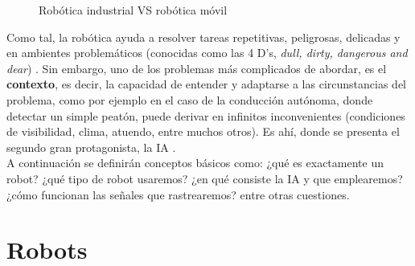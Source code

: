 \begin{figure} [h]
	\centering
	\quad
	\quad
	\caption{Robótica industrial VS robótica móvil}
	\label{fig:industrial_vs_mobile}
\end{figure}

Como tal, la robótica ayuda a resolver tareas repetitivas, peligrosas, delicadas y en ambientes problemáticos (conocidas como las 4 D's, \emph{dull, dirty, dangerous and dear}) \cite{4-d}. Sin embargo, uno de los problemas más complicados de abordar, es el \textbf{contexto}, es decir, la capacidad de entender y adaptarse a las circunstancias del problema, como por ejemplo en el caso de la conducción autónoma, donde detectar un simple peatón, puede derivar en infinitos inconvenientes (condiciones de visibilidad, clima, atuendo, entre muchos otros). Es ahí, donde se presenta el segundo gran protagonista, la \ac{IA} \cite{dworakowski2020robots}.\\

A continuación se definirán conceptos básicos como: ¿qué es exactamente un robot? ¿qué tipo de robot usaremos? ¿en qué consiste la \ac{IA} y que emplearemos? ¿cómo funcionan las señales que rastrearemos? entre otras cuestiones.

\section{Robots}
\label{sec:robots}

